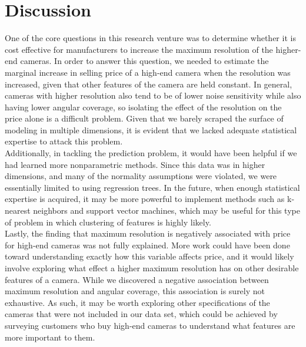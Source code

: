 \documentclass[12pt]{article}
\begin{document}
\pagebreak
\section{Discussion}
One of the core questions in this research venture was to determine whether it is cost effective for manufacturers to increase the maximum resolution of the higher-end cameras. In order to answer this question, we needed to estimate the marginal increase in selling price of a high-end camera when the resolution was increased, given that other features of the camera are held constant. In general, cameras with higher resolution also tend to be of lower noise sensitivity while also having lower angular coverage, so isolating the effect of the resolution on the price alone is a difficult problem. Given that we barely scraped the surface of modeling in multiple dimensions, it is evident that we lacked adequate statistical expertise to attack this problem. \\

Additionally, in tackling the prediction problem, it would have been helpful if we had learned more nonparametric methods. Since this data was in higher dimensions, and many of the normality assumptions were violated, we were essentially limited to using regression trees. In the future, when enough statistical expertise is acquired, it may be more powerful to implement methods such as k-nearest neighbors and support vector machines, which may be useful for this type of problem in which clustering of features is highly likely.\\

Lastly, the finding that maximum resolution is negatively associated with price for high-end cameras was not fully explained. More work could have been done toward understanding exactly how this variable affects price, and it would likely involve exploring what effect a higher maximum resolution has on other desirable features of a camera. While we discovered a negative association between maximum resolution and angular coverage, this association is surely not exhaustive. As such, it may be worth exploring other specifications of the cameras that were not included in our data set, which could be achieved by surveying customers who buy high-end cameras to understand what features are more important to them. 
\end{document}
